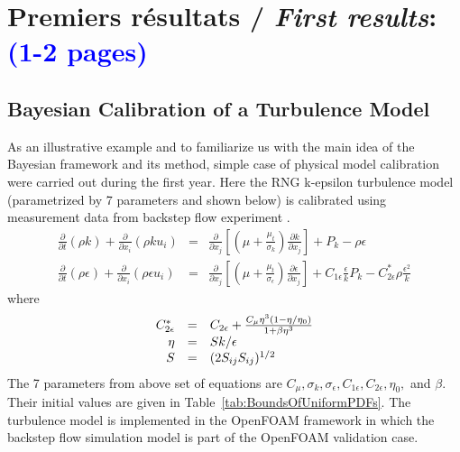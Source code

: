 \documentclass[11pt,titlepage]{article}
\begin{document}
\newpage
\section{Premiers résultats /  {\large\textit{First results}}: \textcolor{blue}{(1-2 pages)}}


\subsection{Bayesian Calibration of a Turbulence Model}

As an illustrative example and to familiarize us with the main idea of the Bayesian framework and its method, simple case of physical model calibration were carried out during the first year. 
Here the RNG k-epsilon turbulence model (parametrized by 7 parameters and shown below) is calibrated using measurement data from backstep flow experiment \cite{Kasagi1995}. 
\begin{equation}
\begin{array}{rrl}

\frac{\partial}{\partial t} (\rho k) + \frac{\partial}{\partial x_i} (\rho k u_i) & = & \frac{\partial}{\partial x_j} \left[\left(\mu+\frac{\mu_t}{\sigma_k}\right) \frac{\partial k}{\partial x_j}\right] + P_k - \rho \epsilon \\
\frac{\partial}{\partial t} (\rho \epsilon) + \frac{\partial}{\partial x_i} (\rho \epsilon u_i) & = & \frac{\partial}{\partial x_j} \left[\left(\mu+\frac{\mu_t}{\sigma_{\epsilon}}\right) \frac{\partial \epsilon}{\partial x_j}\right] + C_{1 \epsilon}\frac{\epsilon}{k} P_k - C_{2\epsilon}^* \rho \frac{\epsilon^2}{k}

\end{array}
\nonumber
\end{equation}
where
\begin{equation}
\begin{array}{rrl}

C_{2\epsilon}^* & = & C_{2\epsilon} + {C_\mu \eta^3 (1-\eta/\eta_0)\over 1+\beta\eta^3} \\

\eta & = & S k / \epsilon \\

S & = & (2S_{ij}S_{ij})^{1/2} \\

\end{array}
\nonumber
\end{equation}
The 7 parameters from above set of equations are $C_\mu, \sigma_k, \sigma_\epsilon, C_{1\epsilon}, C_{2\epsilon}, \eta_0,$ and $\beta$. Their initial values are given in Table~\ref{tab:BoundsOfUniformPDFs}. The turbulence model is implemented in the OpenFOAM framework in which the backstep flow simulation model is part of the OpenFOAM validation case.
\end{document}
